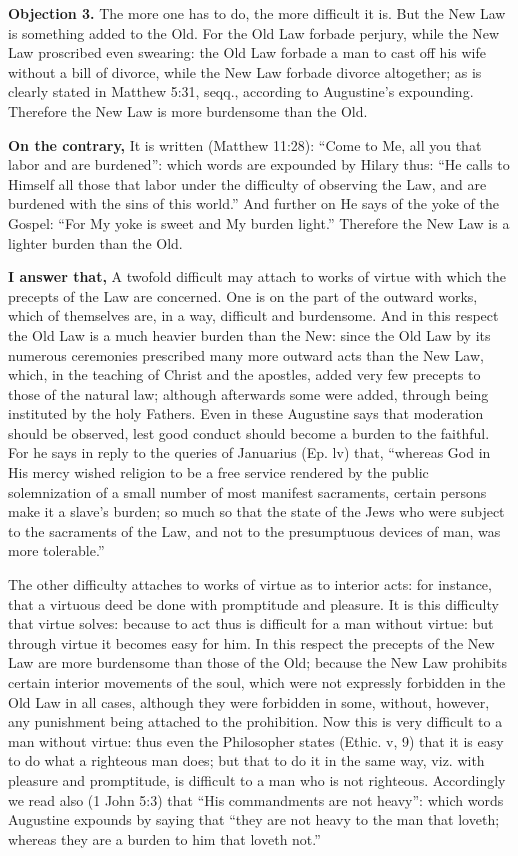 \textbf{Objection 3.} The more one has to do, the more difficult it is. But the New Law is something added to the Old. For the Old Law forbade perjury, while the New Law proscribed even swearing: the Old Law forbade a man to cast off his wife without a bill of divorce, while the New Law forbade divorce altogether; as is clearly stated in Matthew 5:31, seqq., according to Augustine's expounding. Therefore the New Law is more burdensome than the Old.

\textbf{On the contrary,} It is written (Matthew 11:28): ``Come to Me, all you that labor and are burdened'': which words are expounded by Hilary thus: ``He calls to Himself all those that labor under the difficulty of observing the Law, and are burdened with the sins of this world.'' And further on He says of the yoke of the Gospel: ``For My yoke is sweet and My burden light.'' Therefore the New Law is a lighter burden than the Old.

\textbf{I answer that,} A twofold difficult may attach to works of virtue with which the precepts of the Law are concerned. One is on the part of the outward works, which of themselves are, in a way, difficult and burdensome. And in this respect the Old Law is a much heavier burden than the New: since the Old Law by its numerous ceremonies prescribed many more outward acts than the New Law, which, in the teaching of Christ and the apostles, added very few precepts to those of the natural law; although afterwards some were added, through being instituted by the holy Fathers. Even in these Augustine says that moderation should be observed, lest good conduct should become a burden to the faithful. For he says in reply to the queries of Januarius (Ep. lv) that, ``whereas God in His mercy wished religion to be a free service rendered by the public solemnization of a small number of most manifest sacraments, certain persons make it a slave's burden; so much so that the state of the Jews who were subject to the sacraments of the Law, and not to the presumptuous devices of man, was more tolerable.''

The other difficulty attaches to works of virtue as to interior acts: for instance, that a virtuous deed be done with promptitude and pleasure. It is this difficulty that virtue solves: because to act thus is difficult for a man without virtue: but through virtue it becomes easy for him. In this respect the precepts of the New Law are more burdensome than those of the Old; because the New Law prohibits certain interior movements of the soul, which were not expressly forbidden in the Old Law in all cases, although they were forbidden in some, without, however, any punishment being attached to the prohibition. Now this is very difficult to a man without virtue: thus even the Philosopher states (Ethic. v, 9) that it is easy to do what a righteous man does; but that to do it in the same way, viz. with pleasure and promptitude, is difficult to a man who is not righteous. Accordingly we read also (1 John 5:3) that ``His commandments are not heavy'': which words Augustine expounds by saying that ``they are not heavy to the man that loveth; whereas they are a burden to him that loveth not.''

